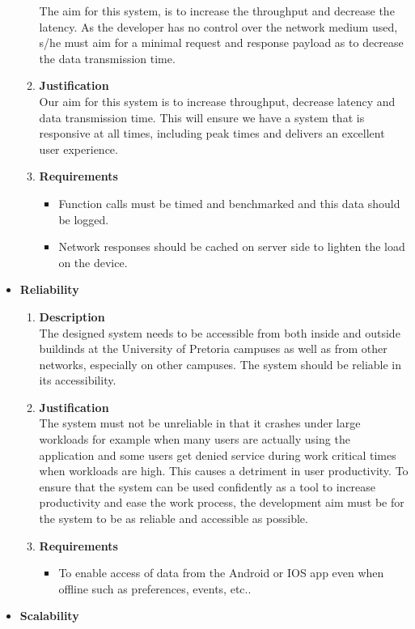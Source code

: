 \documentclass{article}
\begin{document}
\begin{itemize}
\begin{enumerate}
				The aim for this system, is to increase the throughput and decrease the latency. As the developer has no control over the network medium used, s/he must aim for a minimal request and response payload as to decrease the data transmission time.
				\item \textbf{Justification} \\
				Our aim for this system is to increase throughput, decrease latency and data transmission time. This will ensure we have a system that is responsive at all times, including peak times and delivers an excellent user experience.
				\item \textbf{Requirements}
				\begin{itemize}
					\item Function calls must be timed and benchmarked and this data should be logged.
					\item Network responses should be cached on server side to lighten the load on the device.
				\end{itemize}
			\end{enumerate}
			\item \textbf {Reliability}
			\begin{enumerate}
				\item \textbf{Description} \\
				The designed system needs to be accessible from both inside and outside buildinds at the University of Pretoria campuses as well as from other networks, especially on other campuses. The system should be reliable in its accessibility.
				\item \textbf{Justification} \\ 
				The system must not be unreliable in that it crashes under large workloads for example when many users are actually using the application and some users get denied service during work critical times when workloads are high. This causes a detriment in user productivity. To ensure that the system can be used confidently as a tool to increase productivity and ease the work process, the development aim must be for the system to be as reliable and accessible as possible.
				\item \textbf{Requirements}
				\begin{itemize}
					\item To enable access of data from the Android or IOS app even when offline such as preferences, events, etc..
				\end{itemize}
			\end{enumerate}
			\item \textbf {Scalability}

\end{itemize}
\end{document}
